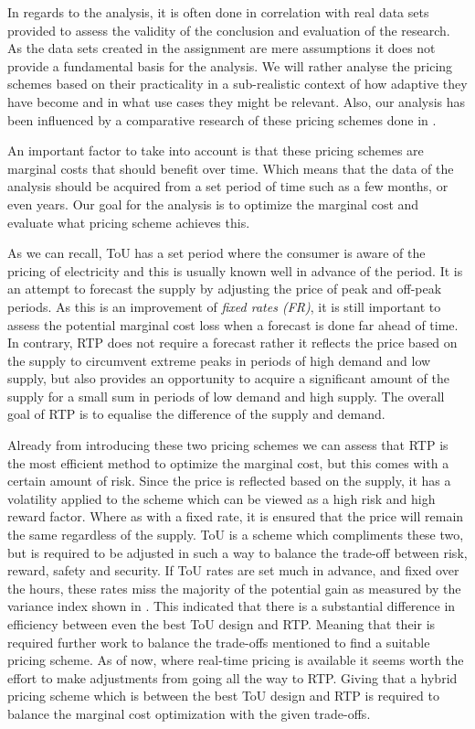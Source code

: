 \documentclass[
11pt, %
english, %
singlespacing, %
parskip, %
headsepline, %
]{report} %
\begin{document}
        In regards to the analysis, it is often done in correlation with real data sets provided to assess the validity of the conclusion and evaluation of the research. As the data sets created in the assignment are mere assumptions it does not provide a fundamental basis for the analysis. We will rather analyse the pricing schemes based on their practicality in a sub-realistic context of how adaptive they have become and in what use cases they might be relevant. Also, our analysis has been influenced by a comparative research of these pricing schemes done in \cite{RTPvsToU}.


        An important factor to take into account is that these pricing schemes are marginal costs that should benefit over time. Which means that the data of the analysis should be acquired from a set period of time such as a few months, or even years. Our goal for the analysis is to optimize the marginal cost and evaluate what pricing scheme achieves this.

        As we can recall, ToU has a set period where the consumer is aware of the pricing of electricity and this is usually known well in advance of the period. It is an attempt to forecast the supply by adjusting the price of peak and off-peak periods. As this is an improvement of \emph{fixed rates (FR)}, it is still important to assess the potential marginal cost loss when a forecast is done far ahead of time. In contrary, RTP does not require a forecast rather  it reflects the price based on the supply to circumvent extreme peaks in periods of high demand and low supply, but also provides an opportunity to acquire a significant amount of the supply for a small sum in periods of low demand and high supply. The overall goal of RTP is to equalise the difference of the supply and demand.

        Already from introducing these two pricing schemes we can assess that RTP is the most efficient method to optimize the marginal cost, but this comes with a certain amount of risk. Since the price is reflected based on the supply, it has a volatility applied to the scheme which can be viewed as a high risk and high reward factor. Where as with a fixed rate, it is ensured that the price will remain the same regardless of the supply. ToU is a scheme which compliments these two, but is required to be adjusted in such a way to balance the trade-off between risk, reward, safety and security. If ToU rates are set much in advance, and fixed over the hours, these rates miss the majority of the potential gain as measured by the variance index shown in \cite{RTPvsToU}. This indicated that there is a substantial difference in efficiency between even the best ToU design and RTP. Meaning that their is required further work to balance the trade-offs mentioned to find a suitable pricing scheme. As of now, where real-time pricing is available it seems worth the effort to make adjustments from going all the way to RTP. Giving that a hybrid pricing scheme which is between the best ToU design and RTP is required to balance the marginal cost optimization with the given trade-offs.
\end{document}
